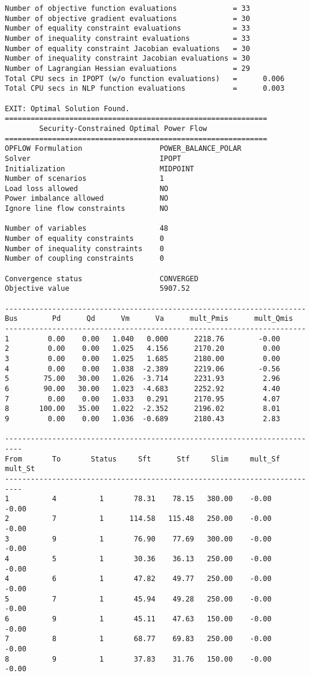 \begin{lstlisting}
Number of objective function evaluations             = 33
Number of objective gradient evaluations             = 30
Number of equality constraint evaluations            = 33
Number of inequality constraint evaluations          = 33
Number of equality constraint Jacobian evaluations   = 30
Number of inequality constraint Jacobian evaluations = 30
Number of Lagrangian Hessian evaluations             = 29
Total CPU secs in IPOPT (w/o function evaluations)   =      0.006
Total CPU secs in NLP function evaluations           =      0.003

EXIT: Optimal Solution Found.
=============================================================
        Security-Constrained Optimal Power Flow
=============================================================
OPFLOW Formulation                  POWER_BALANCE_POLAR
Solver                              IPOPT
Initialization                      MIDPOINT
Number of scenarios                 1
Load loss allowed                   NO
Power imbalance allowed             NO
Ignore line flow constraints        NO

Number of variables                 48
Number of equality constraints      0
Number of inequality constraints    0
Number of coupling constraints      0

Convergence status                  CONVERGED
Objective value                     5907.52

----------------------------------------------------------------------
Bus        Pd      Qd      Vm      Va      mult_Pmis      mult_Qmis
----------------------------------------------------------------------
1         0.00    0.00   1.040   0.000      2218.76        -0.00
2         0.00    0.00   1.025   4.156      2170.20         0.00
3         0.00    0.00   1.025   1.685      2180.00         0.00
4         0.00    0.00   1.038  -2.389      2219.06        -0.56
5        75.00   30.00   1.026  -3.714      2231.93         2.96
6        90.00   30.00   1.023  -4.683      2252.92         4.40
7         0.00    0.00   1.033   0.291      2170.95         4.07
8       100.00   35.00   1.022  -2.352      2196.02         8.01
9         0.00    0.00   1.036  -0.689      2180.43         2.83

--------------------------------------------------------------------------
From       To       Status     Sft      Stf     Slim     mult_Sf  mult_St
--------------------------------------------------------------------------
1          4          1       78.31    78.15   380.00    -0.00    -0.00
2          7          1      114.58   115.48   250.00    -0.00    -0.00
3          9          1       76.90    77.69   300.00    -0.00    -0.00
4          5          1       30.36    36.13   250.00    -0.00    -0.00
4          6          1       47.82    49.77   250.00    -0.00    -0.00
5          7          1       45.94    49.28   250.00    -0.00    -0.00
6          9          1       45.11    47.63   150.00    -0.00    -0.00
7          8          1       68.77    69.83   250.00    -0.00    -0.00
8          9          1       37.83    31.76   150.00    -0.00    -0.00


\end{lstlisting}
